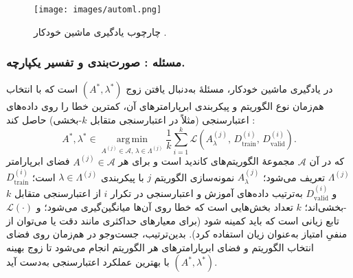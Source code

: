 \begin{figure}[h!]
    \centering
    \texttt{[image: images/automl.png]}
    \caption[چارچوب یادگیری ماشین خودکار]{
        چارچوب یادگیری ماشین خودکار
         \cite{salehin2024automl}.
    }
    \label{fig:automl}
\end{figure}

\subsubsection[مسئله \lr{CASH}: صورت‌بندی و تفسیر یکپارچه.]{مسئله : صورت‌بندی و تفسیر یکپارچه.}
در یادگیری ماشین خودکار، مسئلهٔ  به‌دنبال یافتن زوج \((A^{*}, \lambda^{*})\) است که با انتخاب هم‌زمان نوع الگوریتم و پیکربندی ابرپارامترهای آن، کمترین خطا را روی داده‌های اعتبارسنجی (مثلاً در اعتبارسنجی متقابل \(k\)-بخشی) حاصل کند \cite{10.1145/2487575.2487629}:
\begin{equation}
\label{eq:cash}
A^{*}, \lambda^{*} \in
\operatorname*{arg\,min}_{A^{(j)} \in \mathcal{A},\, \lambda \in \Lambda^{(j)}}
\frac{1}{k}\sum_{i=1}^{k}
\mathcal{L}\!\left(A^{(j)}_{\lambda},\, D^{(i)}_{\mathrm{train}},\, D^{(i)}_{\mathrm{valid}}\right).
\end{equation}
که در آن \(\mathcal{A}\) مجموعهٔ الگوریتم‌های کاندید است و برای هر \(A^{(j)} \in \mathcal{A}\) فضای ابرپارامتر \(\Lambda^{(j)}\) تعریف می‌شود؛ \(A^{(j)}_{\lambda}\) نمونه‌سازی الگوریتم \(j\) با پیکربندی \(\lambda \in \Lambda^{(j)}\) است؛ \(D^{(i)}_{\mathrm{train}}\) و \(D^{(i)}_{\mathrm{valid}}\) به‌ترتیب داده‌های آموزش و اعتبارسنجی در تکرار \(i\) از اعتبارسنجی متقابل \(k\)-بخشی‌اند؛ \(k\) تعداد بخش‌هایی است که خطا روی آن‌ها میانگین‌گیری می‌شود؛ و \(\mathcal{L}(\cdot)\) تابع زیانی است که باید کمینه شود (برای معیارهای حداکثری مانند دقت یا  می‌توان از منفیِ امتیاز به‌عنوان زیان استفاده کرد). بدین‌ترتیب، جست‌وجو در  هم‌زمان روی فضای انتخاب الگوریتم و فضای ابرپارامترهای هر الگوریتم انجام می‌شود تا زوج بهینه \((A^{*}, \lambda^{*})\) با بهترین عملکرد اعتبارسنجی به‌دست آید.
